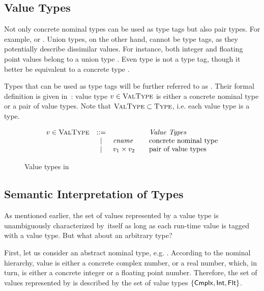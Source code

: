 \subsection{Value Types}

Not only concrete nominal types can be used as type tags
but also pair types. For example, \typair{\tyint}{\tyint}
or \typair{\tystr}{(\typair{\tyint}{\tyint})}.
Union types, on the other hand, cannot be type tags, 
as they potentially describe dissimilar values.
For instance, both integer and floating point values belong
to a union type \tyunion{\tyint}{\tyflt}.
Even type \tyunion{\tyint}{\tyint} is not a type tag, 
though it better be equivalent to a concrete type \tyint.

Types that can be used as type tags will be further referred to
as . 
Their formal definition is given in~:
value type $v \in \textsc{ValType}$ is either a concrete nominal type 
or a pair of value types. 
Note that $\textsc{ValType} \subset \textsc{Type}$, i.e. each value type is a type.

\begin{figure}
	\[
	\begin{array}{rcl@{\qquad}l}
	\vty \in \VType & ::= & & \text{\emph{Value Types}}
	\\ &\Alt& \cname & \text{concrete nominal type}
	\\ &\Alt& \typair{\vty_1}{\vty_2} & \text{pair of value types}
	\end{array}
	\]
	\caption{Value types in \BetaJulia}
	\label{fig:bjsem-value-types}
\end{figure}


\subsection{Semantic Interpretation of Types}

As mentioned earlier, the set of values represented by a value type \vty
is unambiguously characterized by~\vty itself
as long as each run-time value is tagged with a value type.
But what about an arbitrary type?

First, let us consider an abstract nominal type, e.g. \tynum. 
According to the nominal hierarchy, \tynum value 
is either a concrete complex number, or a real number, which, in turn,
is either a concrete integer or a floating point number.
Therefore, the set of values represented by \tynum 
is described by the set of value types $\{\mathsf{Cmplx}, \mathsf{Int}, \mathsf{Flt}\}$.

